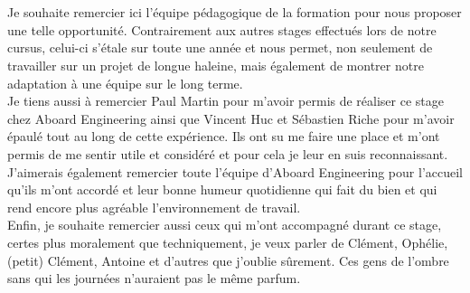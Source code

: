 \thispagestyle{empty}
\chapter*{}
\begin{flushright}
  \begin{minipage}[t]{0.6\textwidth}
	Je souhaite remercier ici l'équipe pédagogique de la formation pour nous
	proposer une telle opportunité. Contrairement aux autres stages
	effectués lors de notre cursus, celui-ci s'étale sur toute une année et nous
	permet, non seulement de travailler sur un projet de longue haleine, mais
	également de montrer notre adaptation à une équipe sur le long terme.\\

	Je tiens aussi à remercier Paul {\sc Martin} pour m'avoir permis de réaliser
	ce stage chez Aboard Engineering ainsi que Vincent {\sc Huc} et Sébastien
	{\sc Riche} pour m'avoir épaulé tout au long de cette expérience. Ils ont su
	me faire une place et m'ont permis de me sentir utile et considéré et pour cela je leur
	en suis reconnaissant.\\
	J'aimerais également remercier toute l'équipe d'Aboard Engineering pour
	l'accueil qu'ils m'ont accordé et leur bonne humeur quotidienne qui fait du
	bien et qui rend encore plus agréable l'environnement de travail.\\

	Enfin, je souhaite remercier aussi ceux qui m'ont accompagné durant ce
	stage, certes plus moralement que techniquement, je veux parler de Clément,
	Ophélie, (petit) Clément, Antoine et d'autres que j'oublie sûrement. Ces gens de
	l'ombre sans qui les journées n'auraient pas le même parfum.
  \end{minipage}
\end{flushright}
